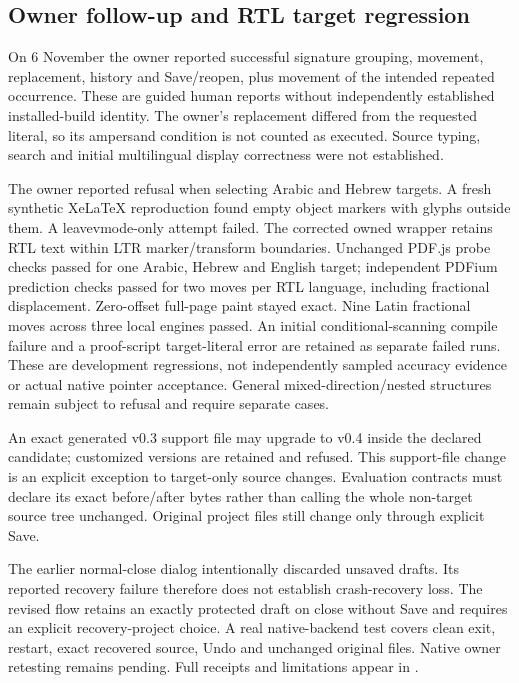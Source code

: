 \subsection{Owner follow-up and RTL target regression}
On 6 November the owner reported successful signature grouping, movement,
replacement, history and Save/reopen, plus movement of the intended repeated
occurrence. These are guided human reports without independently established
installed-build identity. The owner's replacement differed from the requested
literal, so its ampersand condition is not counted as executed. Source typing,
search and initial multilingual display correctness were not established.

The owner reported refusal when selecting Arabic and Hebrew targets. A fresh
synthetic XeLaTeX reproduction found empty object markers with glyphs outside
them. A leavevmode-only attempt failed. The corrected owned wrapper retains
RTL text within LTR marker/transform boundaries. Unchanged PDF.js probe checks
passed for one Arabic, Hebrew and English target; independent PDFium prediction
checks passed for two moves per RTL language, including fractional displacement.
Zero-offset full-page paint stayed exact. Nine Latin fractional moves across
three local engines passed. An initial conditional-scanning compile failure
and a proof-script target-literal error are retained as separate failed runs.
These are development regressions, not independently sampled accuracy evidence
or actual native pointer acceptance. General mixed-direction/nested structures
remain subject to refusal and require separate cases.

An exact generated v0.3 support file may upgrade to v0.4 inside the declared
candidate; customized versions are retained and refused. This support-file
change is an explicit exception to target-only source changes. Evaluation
contracts must declare its exact before/after bytes rather than calling the
whole non-target source tree unchanged. Original project files still change
only through explicit Save.

The earlier normal-close dialog intentionally discarded unsaved drafts. Its
reported recovery failure therefore does not establish crash-recovery loss.
The revised flow retains an exactly protected draft on close without Save and
requires an explicit recovery-project choice. A real native-backend test covers
clean exit, restart, exact recovered source, Undo and unchanged original files.
Native owner retesting remains pending. Full receipts and limitations appear in
.

